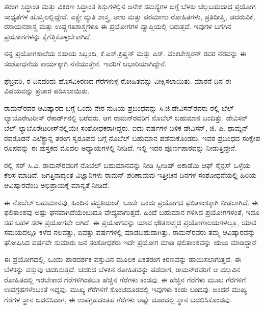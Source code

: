
ತರಂಗ ಸಿದ್ಧಾಂತ ಮತ್ತು ವಿಕಿರಣ ಸಿದ್ಧಾಂತ ಶಿಸ್ತುಗಳಲ್ಲಿನ ಅನೇಕ ಸಮಸ್ಯೆಗಳ ಬಗ್ಗೆ ಬೆಳಕು ಚೆಲ್ಲಬಹುದಾದ ಪ್ರಯೋಗ ಸಾಧ್ಯತೆಗಳ ಹೊಸ್ತಿಲಲ್ಲಿದ್ದೇವೆ. ಎಕ್ಸ್\enginline{-}ರೇ ದ್ಯುತಿ ಶಾಸ್ತ್ರ, ಅಣು ಮತ್ತು ಪರಮಾಣು ರೋಹಿತಗಳು, ಪ್ರತಿದೀಪ್ತಿ, ಚದರುವಿಕೆ, ರಸಾಯನಶಾಸ್ತ್ರ ಮತ್ತು ಉಷ್ಣಗತಿಶಾಸ್ತ್ರಗಳೂ ಈ ಪ್ರಯೋಗಗಳ ವ್ಯಾಪ್ತಿಯಲ್ಲಿ ಬರುತ್ತವೆ. ಇವುಗಳ ಬಗೆಗಿನ ಪ್ರಯೋಗಗಳನ್ನು ಕೈಗೆತ್ತಿಕೊಳ್ಳಬೇಕಾಗಿದೆ.

ನನ್ನ ಪ್ರಯೋಗಶಾಲೆಯ ಸಹಾಯ ಸಿಬ್ಬಂದಿ, ಕೆ.ಎಸ್.ಕ್ರಿಷ್ಣನ್ ಮತ್ತು ಎಸ್. ವೆಂಕಟೇಶ್ವರನ್ ರವರ ನೆರವನ್ನು ಈ ಸಂಶೋಧನೆಯ ಕಾರ್ಯಕ್ಕಾಗಿ ನೆನೆಯುತ್ತೇನೆ. ಇವರಿಗೆ ಆಭಾರಿಯಾಗಿದ್ದೇನೆ.

 ಫೆಬ್ರವರಿ,  ರ ದಿನದಂದು ಹೊಸವಿಕಿರಣದ ಗೆರೆಗಳುಳ್ಳ ರೋಹಿತವನ್ನು ವೀಕ್ಷಿಸ\-ಲಾಯಿತು. ಮಾರನೆ ದಿನ ಈ ವಿಷಯವನ್ನು ಪ್ರಚಾರ ಪಡಿಸಲಾಯಿತು.



ರಾಮನ್‍ರವರ ಆವಿಷ್ಕಾರದ ಬಗ್ಗೆ ಒಂದು ನೇರ ನುಡಿಯ ಪ್ರಬಂಧವನ್ನು ಸಿ.ಜಿ.ಡೇವಿಸನ್‌ರವರು ರಲ್ಲಿ ಬೆಲ್ ಲ್ಯಾಬೊರೇಟರೀಸ್ ರೆಕಾರ್ಡ್‌ನಲ್ಲಿ ಬರೆದರು. ಆಗ ರಾಮನ್‍ರವರಿಗೆ ನೊಬೆಲ್ ಬಹುಮಾನ ಬಂದಿತ್ತು. ಡೇವಿಸನ್ ಬೆಲ್ ಲ್ಯಾಬೊರೇಟರೀಸ್‌ನಲ್ಲಿಯೇ ಸಂಶೋಧಕರಾಗಿದ್ದರು. ಐದು ವರ್ಷಗಳ ಬಳಿಕ ಡೇವಿಸನ್, ಜಿ. ಪಿ. ಥಾಮ್ಸನ್ ರವರೊಡನೆ ಎಲೆಕ್ಟ್ರಾನ್ನ ತರಂಗ ಸ್ವರೂಪದ ಬಗ್ಗೆ ನೊಬೆಲ್ ಬಹುಮಾನ ಪಡೆದುಕೊಂಡರು. ಇವರ ಪ್ರಬಂಧದ ಸಂಕ್ಷೇಪ ರೂಪವನ್ನು ಈ ಪುಸ್ತಕದ ಮೊದಲ ಅಧ್ಯಾಯಗಳಲ್ಲಿ ನೀಡಿದೆ. ಇಲ್ಲಿ ಇದರ ಪೂರ್ಣಪಾಠವನ್ನು ನೀಡುತ್ತಿದ್ದೇನೆ.

ರಲ್ಲಿ ಸರ್ ಸಿ.ವಿ. ರಾಮನ್‍ರವರಿಗೆ ನೊಬೆಲ್ ಬಹುಮಾನವನ್ನು ನೀಡಿ ಸ್ವೀಡಿಷ್ ಅಕಾಡೆಮಿ ಆಫ್ ಸೈನ್ಸಸ್ ಒಳ್ಳೆಯ ಕೆಲಸ ಮಾಡಿದೆ. ಜಗತ್ತಿನಾದ್ಯಂತ ವಿಜ್ಞಾನಿಗಳು ರಾಮನ್ ಪರಿಣಾಮವು ಇತ್ತೀಚಿನ ದಿನಗಳ ಸಂಶೋಧನೆಯಲ್ಲಿ ಹಿರಿಯ ಆವಿಷ್ಕಾರವೆಂಬ ಅಭಿಪ್ರಾಯಕ್ಕೆ ಮಾನ್ಯತೆ ನೀಡಿದೆ.

ಈ ನೊಬೆಲ್ ಬಹುಮಾನವು, ಹಿಂದಿನ ಪದ್ಧತಿಯಂತೆ, ಒಂದೇ ಒಂದು ಪ್ರಯೋಗದ ಫಲಿತಾಂಶಕ್ಕಾಗಿ ನೀಡಲಾಗಿದೆ. ಈ ಫಲಿತಾಂಶವು ಅಷ್ಟು ಘನವಾಗಿದೆಯೆಂಬುದೂ ವೇದ್ಯವಾಗುತ್ತದೆ. ಹಿಂದೆ ಬಹುಮಾನ ಗಳಿಸಿದ ಪ್ರಯೋಗಗಳಂತೆ, ಇದೂ ಸಹ ಬಹಳ ಸರಳ ಪ್ರಯೋಗವೇ ಆಗಿದೆ. ಈ ಪ್ರಯೋಗವನ್ನು ಯಾವ ಭೌತಶಾಸ್ತ್ರದ ಪ್ರಯೋಗಾಲಯಗಳಲ್ಲೂ, ಯಾವ ಸಮಯದಲ್ಲೂ ಕಳೆದ ನಲವತ್ತು, ಐವತ್ತು ವರ್ಷಗಳಲ್ಲಿ ಮಾಡಬಹುದಾಗಿತ್ತು. ರಾಮನ್‍ರವರು ತಮ್ಮ ಆವಿಷ್ಕಾರವನ್ನು ಘೋಷಿಸಿದ ವರ್ಷವೇ ಸುಮಾರು  ಜನ ಸಂಶೋಧಕರು ಇದೇ ಪ್ರಯೋಗ ಮಾಡಿ ಫಲಿತಾಂಶವನ್ನು ಋಜು ಮಾಡಿದ್ದಾರೆ.

ಈ ಪ್ರಯೋಗದಲ್ಲಿ, ಒಂದು ಪಾರದರ್ಶಕ ವಸ್ತುವಿನ ಮೂಲಕ ಏಕತರಂಗ ಕಿರಣವನ್ನು ಹಾಯಿಸಲಾಗುತ್ತದೆ. ಈ ಬೆಳಕನ್ನು ವಸ್ತುವು ಚದರಿಸುತ್ತದೆ. ಚದರಿದ ಬೆಳಕಿನ ರೋಹಿತವನ್ನು ಪಡೆದಾಗ, ರಾಮನ್‍ರವರಿಗೆ ಆ ವಸ್ತುವಿನ ರೋಹಿತದಲ್ಲಿ ಇರಬೇಕಾದ ಗೆರೆಗಳಿಗಿಂತಲೂ ಹೆಚ್ಚಿನ ಗೆರೆಗಳು ಕಂಡವು. ಈ ಹೆಚ್ಚಿನ ಗೆರೆಗಳು ಮೂಲ ಗೆರೆಗಳಿಗೆ ಉಪಗ್ರಹಗಳೆಂಬಂತೆ ಇದ್ದವು. ಮುಖ್ಯ ಗೆರೆಗಳಿಗೆ ಕೊಂಚದೂರದಲ್ಲಿ ಇವುಗಳು ಕಂಡು ಬಂದವು. ಅಂದರೆ ಮುಖ್ಯ ಗೆರೆಗಳ ಸ್ಥಾನ ಬದಲಿಸಿದಾಗ, ಈ ಉಪಗ್ರಹದಂತಹ ಗೆರೆಗಳು ಅಷ್ಟೇ ದೂರದಲ್ಲಿ ಸ್ಥಾನ ಬದಲಿಸಿಕೊಂಡವು.

